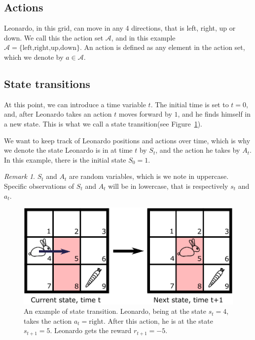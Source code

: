 \documentclass[
  letterpaper,
]{report}
\theoremstyle{plain}
\theoremstyle{definition}
\theoremstyle{definition}
\theoremstyle{remark}
\newtheorem*{remark}{Remark}
\begin{document}
\hypertarget{actions}{%
\subsection{Actions}\label{actions}}

Leonardo, in this grid, can move in any 4 directions, that is left,
right, up or down. We call this the action set \(\mathcal{A}\), and in
this example \(\mathcal{A} = \{\text{left,right,up,down}\}\). An action
is defined as any element in the action set, which we denote by
\(a\in\mathcal{A}\).

\hypertarget{state-transitions}{%
\subsection{State transitions}\label{state-transitions}}

At this point, we can introduce a time variable \(t\). The initial time
is set to \(t=0\), and, after Leonardo takes an action \(t\) moves
forward by \(1\), and he finds himself in a new state. This is what we
call a state transition(see Figure~\ref{fig-gridworld_transition}).

We want to keep track of Leonardo positions and actions over time, which
is why we denote the state Leonardo is in at time \(t\) by \(S_t\), and
the action he takes by \(A_t\). In this example, there is the initial
state \(S_0 = 1\).

\begin{remark}

\(S_t\) and \(A_t\) are random variables, which is we note in uppercase.
Specific observations of \(S_t\) and \(A_t\) will be in lowercase, that
is respectively \(s_t\) and \(a_t\).

\end{remark}

\begin{figure}

{\centering \includegraphics{./images/gridworld_transition.pdf}

}

\caption{\label{fig-gridworld_transition}An example of state transition.
Leonardo, being at the state \(s_t = 4\), takes the action
\(a_t = \text{right}\). After this action, he is at the state
\(s_{t+1} = 5\). Leonardo gets the reward \(r_{t+1} = -5\).}

\end{figure}
\end{document}
